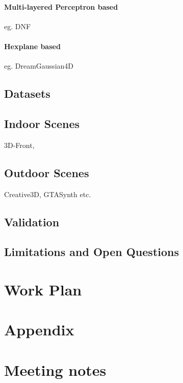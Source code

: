\documentclass{article}
\begin{document}
\paragraph{Multi-layered Perceptron based} eg. DNF

\paragraph{Hexplane based} eg. DreamGaussian4D

\subsection{Datasets}

\subsection{Indoor Scenes}

3D-Front, 

\subsection{Outdoor Scenes}

Creative3D, GTASynth etc.

\subsection{Validation}

\subsection{Limitations and Open Questions}


\section{Work Plan}





\section*{Appendix}

\section{Meeting notes}
\end{document}
